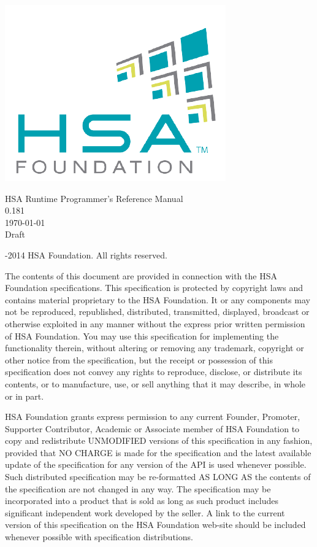 \documentclass[final]{book}
\newcommand{\doctitle}{HSA Runtime Programmer's Reference Manual}
\newcommand{\docversion}{0.181}
\begin{document}
\hypersetup{pageanchor=false,citecolor=black}
\begin{titlepage}
\includegraphics[width=.5\textwidth]{fig/foundation.png}
\vspace*{7cm}
\begin{center}
{\Large \doctitle\\[1ex]\large\docversion}\\
\vspace*{1cm}
\vspace*{0.5cm}
{\small \today}\\
\vspace*{0.5cm}
{\small Draft}\\
\end{center}
\end{titlepage}
\thispagestyle{empty} {-2014 HSA Foundation. All rights
  reserved.}


The contents of this document are provided in connection with the HSA Foundation
specifications. This specification is protected by copyright laws and contains
material proprietary to the HSA Foundation. It or any components may not be
reproduced, republished, distributed, transmitted, displayed, broadcast or
otherwise exploited in any manner without the express prior written permission
of HSA Foundation. You may use this specification for implementing the
functionality therein, without altering or removing any trademark, copyright or
other notice from the specification, but the receipt or possession of this
specification does not convey any rights to reproduce, disclose, or distribute
its contents, or to manufacture, use, or sell anything that it may describe, in
whole or in part.

HSA Foundation grants express permission to any current Founder, Promoter,
Supporter Contributor, Academic or Associate member of HSA Foundation to copy
and redistribute UNMODIFIED versions of this specification in any fashion,
provided that NO CHARGE is made for the specification and the latest available
update of the specification for any version of the API is used whenever
possible. Such distributed specification may be re-formatted AS LONG AS the
contents of the specification are not changed in any way. The specification may
be incorporated into a product that is sold as long as such product includes
significant independent work developed by the seller. A link to the current
version of this specification on the HSA Foundation web-site should be included
whenever possible with specification distributions.
\end{document}
